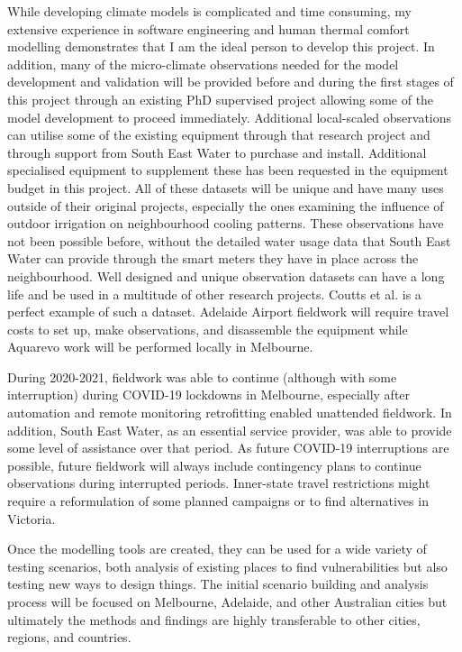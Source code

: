 While developing climate models is complicated and time consuming, my extensive experience in software engineering and human thermal comfort modelling demonstrates that I am the ideal person to develop this project. In addition, many of the micro-climate observations needed for the model development and validation will be provided before and during the first stages of this project through an existing PhD supervised project allowing some of the model development to proceed immediately. Additional local-scaled observations can utilise some of the existing equipment through that research project and through support from South East Water to purchase and install. Additional specialised equipment to supplement these has been requested in the equipment budget in this project. All of these datasets will be unique and have many uses outside of their original projects, especially the ones examining the influence of outdoor irrigation on neighbourhood cooling patterns. These observations have not been possible before, without the detailed water usage data that South East Water can provide through the smart meters they have in place across the neighbourhood. Well designed and unique observation datasets can have a long life and be used in a multitude of other research projects. Coutts et al.\cite{Coutts2007} is a perfect example of such a dataset. Adelaide Airport fieldwork will require travel costs to set up, make observations, and disassemble the equipment while Aquarevo work will be performed locally in Melbourne.

During 2020-2021, fieldwork was able to continue (although with some interruption) during COVID-19 lockdowns in Melbourne, especially after automation and remote monitoring retrofitting enabled unattended fieldwork. In addition, South East Water, as an essential service provider, was able to provide some level of assistance over that period. As future COVID-19 interruptions are possible, future fieldwork will always include contingency plans to continue observations during interrupted periods. Inner-state travel restrictions might require a reformulation of some planned campaigns or to find alternatives in Victoria.

Once the modelling tools are created, they can be used for a wide variety of testing scenarios, both analysis of existing places to find vulnerabilities but also testing new ways to design things. The initial scenario building and analysis process will be focused on Melbourne, Adelaide, and other Australian cities but ultimately the methods and findings are highly transferable to other cities, regions, and countries.

